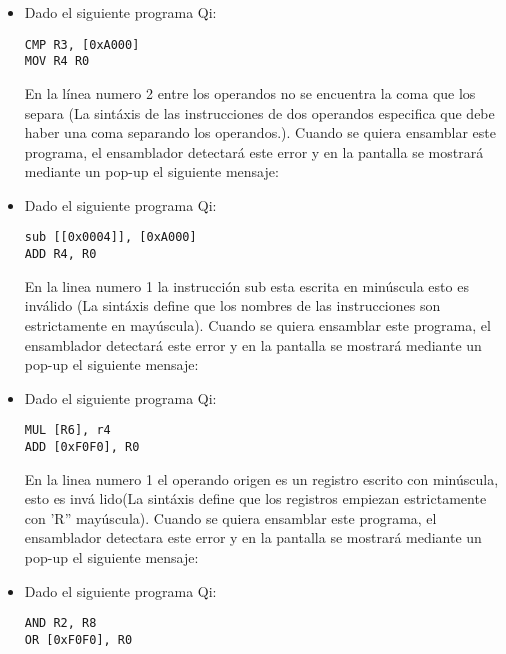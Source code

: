 \begin{itemize}

\item Dado el siguiente programa Qi:

\begin{verbatim}
CMP R3, [0xA000]
MOV R4 R0 
\end{verbatim}

En la línea numero 2 entre los operandos no se encuentra la coma que los separa (La sintáxis de las instrucciones de dos operandos especifica que debe haber una coma separando los operandos.). Cuando se quiera ensamblar este programa, el ensamblador detectará este error y en la pantalla se mostrará mediante un pop-up el siguiente mensaje:


\item Dado el siguiente programa Qi:

\begin{verbatim}
sub [[0x0004]], [0xA000]
ADD R4, R0
\end{verbatim}

En la linea numero 1 la instrucción sub esta escrita en minúscula esto es inválido (La sintáxis define que los nombres de las instrucciones son estrictamente en mayúscula). Cuando se quiera ensamblar este programa, el ensamblador detectará este error y en la pantalla se mostrará mediante un pop-up el siguiente mensaje:


\item Dado el siguiente programa Qi:

\begin{verbatim}
MUL [R6], r4
ADD [0xF0F0], R0
\end{verbatim}

En la linea numero 1 el operando origen es un registro escrito con minúscula, esto es invá lido(La sintáxis define que los registros empiezan estrictamente con 'R'' mayúscula). Cuando se quiera ensamblar este programa, el ensamblador detectara este error y en la pantalla se mostrará mediante un pop-up el siguiente mensaje:


\item Dado el siguiente programa Qi:

\begin{verbatim}
AND R2, R8
OR [0xF0F0], R0
\end{verbatim}


\end{itemize}
